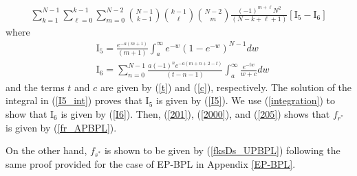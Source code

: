\documentclass[journal,twocolumn]{IEEEtran}
\begin{document}
\begin{align}\label{205}
\displaystyle \sum_{k=1}^{N-1} \sum_{\ell=0}^{k-1} \sum_{m=0}^{N-2}\!\!\!  
{\!N\!-\!1\! \choose\! k\!-\!1\!}\! {\!k\!-\!1\! \choose\! \ell\!} \!{\!N\!-\!2\! \choose\! m\!} 
\frac{(-\!1)^{m+\ell}N^2}{(N\!-\!k\!+\!\ell\!+\!1)} \left[ \mathrm{I}_{5}\! -\! \mathrm{I}_{6} \right]
\end{align}
where
\begin{align}
& \mathrm{I}_{5}=
\frac{e^{-a(m+1)}}{(m+1)} \int_{a}^{\infty} e^{-w}(1-e^{-w})^{N-1}dw  \label{I5_int}\\
& 
\mathrm{I}_{6}=\displaystyle \sum_{n=0}^{N-1} 
\frac{ a (-1)^{n} e^{-a(m+n+2-t)}}{(t-n-1)}
\int_{a}^{\infty} \frac{e^{-tw}}{w+c} dw \label{I6_int}
\end{align}
and the terms $t$ and $c$ are given by (\ref{t}) and (\ref{c}), respectively. The solution of the integral in (\ref{I5_int}) proves that $\mathrm{I}_{5}$ is given by (\ref{I5}). We use (\ref{integration}) to show that $\mathrm{I}_{6}$ is given by (\ref{I6}). Then, (\ref{201}), (\ref{2000}), and (\ref{205}) shows that $f_{r^*}$ is given by (\ref{fr_APBPL}).  

On the other hand, $f_{s^*}$ is shown to be given by (\ref{fksDs_UPBPL}) following the same proof provided for the case of EP-BPL in Appendix \ref{EP-BPL}.


\renewcommand{\baselinestretch}{1.5}




\end{document}
